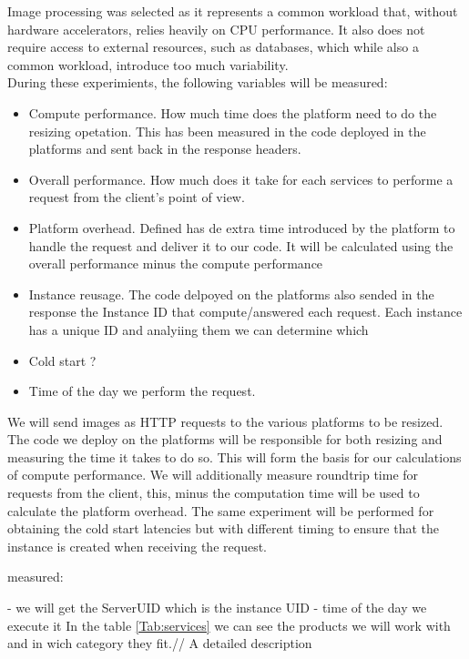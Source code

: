 \documentclass[11pt]{article}
\begin{document}
Image processing was selected as it represents a common workload that, without hardware accelerators, relies heavily on CPU performance. It also does not require access to external resources, such as databases, which while also a common workload, introduce too much variability. \\

During these experimients, the following variables will be measured: 


\begin{itemize}
\item Compute performance. How much time does the platform need to do the resizing opetation. This has been measured in the code deployed in the platforms and sent back in the response headers. 
\item Overall performance. How much does it take for each services to performe a request from the client's point of view. 
\item Platform overhead. Defined has de extra time introduced by the platform to handle the request and deliver it to our code. It will be calculated using the overall performance minus the compute performance
\item Instance reusage. The code delpoyed on the platforms also sended in the response the Instance ID that compute/answered each request. Each instance has a unique ID and analyiing them we can determine which  
\item Cold start ?
\item Time of the day we perform the request.
\end{itemize}


We will send images as HTTP requests to the various platforms to be resized. The code we deploy on the platforms will be responsible for both resizing and measuring the time it takes to do so. This will form the basis for our calculations of compute performance. We will additionally measure roundtrip time for requests from the client, this, minus the computation time will be used to calculate the platform overhead.  The same experiment will be performed for obtaining the cold start latencies but with different timing to ensure that the instance is created when receiving the request.



measured:





- we will get the ServerUID which is the instance UID
- time of the day we execute it
In the table \ref{Tab:services} we can see the products we will work with and in wich category they fit.// A detailed description \\
\end{document}
